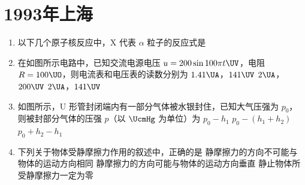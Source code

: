 \documentclass[\gkver]{gaokaozhenti}
\begin{document}
\chapter{1993年上海}

\begin{enumerate}
\item
以下几个原子核反应中，X 代表 $\alpha$ 粒子的反应式是
{}
{}
{}

\item
在如图所示电路中，已知交流电源电压 $u = 200\sin 100\pi t\UV$，电阻 $R = 100\UO$，则电流表和电压表的读数分别为
\onepicture{}
{$1.41\UA$，$141\UV$}
{$2\UA$，$200\UV$}
{$2\UA$，$141\UV$}

\item
如图所示，U 形管封闭端内有一部分气体被水银封住，已知大气压强为 $p_{0}$，则被封部分气体的压强 $p$（以 $\UcmHg$ 为单位）为
\onepicture{}
{$p_{0} - h_{1}$}
{$p_{0} - (h_{1} + h_{2})$}
{$p_{0} + h_{2} - h_{1}$}

\item
下列关于物体受静摩擦力作用的叙述中，正确的是
{静摩擦力的方向不可能与物体的运动方向相同}
{静摩擦力的方向可能与物体的运动方向垂直}
{静止物体所受静摩擦力一定为零}


\end{enumerate}
\end{document}
